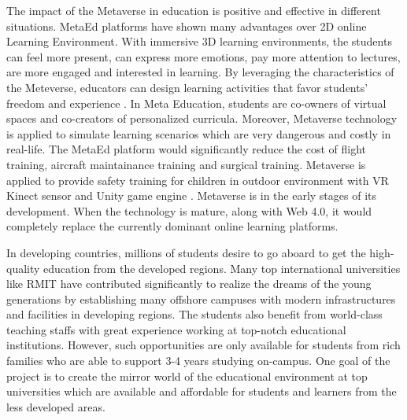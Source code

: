 \documentclass[
    ngerman,american
    ]{scrartcl}
\begin{document}
                       
        \sectionImpact        
         
         The impact of the Metaverse in education is positive and effective in different situations\cite{tlili_metaed_2022}. 
         MetaEd platforms have shown many advantages over 2D online Learning Environment. With immersive 3D learning environments, 
         the students can feel more present, can express more emotions, pay more attention to lectures, are more engaged and interested 
         in learning. By leveraging the characteristics of the Meteverse, educators can
         design learning activities that favor students' freedom and experience \cite{bokyung_meta_ed_2022}. 
         In Meta Education, students are co-owners of virtual spaces and co-creators of personalized curricula. 
         Moreover, Metaverse technology is applied to simulate learning scenarios which are very dangerous and costly in real-life.   
         The MetaEd platform would significantly reduce the cost of flight training, aircraft maintainance training and surgical training. 
         Metaverse is applied to provide safety training for children in outdoor environment with VR Kinect sensor and 
         Unity game engine \cite{park_meta_taxonomy_2022}.
         Metaverse is in the early stages of its development. 
         When the technology is mature, along with Web 4.0, it would completely replace the currently dominant online learning platforms.          
         \par
         In developing countries, millions of students desire to go aboard to get
         the high-quality education from the developed regions. Many top international 
         universities like RMIT have contributed significantly to realize the dreams of the young generations by establishing 
         many offshore campuses with modern infrastructures and facilities in developing regions. The students also benefit from world-class 
         teaching staffs with great experience working at top-notch educational institutions. However, such opportunities 
         are only available for students from rich families who are able to support 3-4 years studying on-campus. 
         One goal of the project is to create the mirror world of the educational environment at top universities which are 
         available and affordable for students and learners from the less developed areas.
         
    
\end{document}

